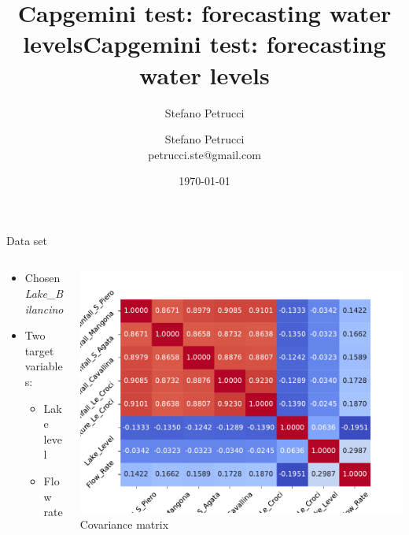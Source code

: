 \documentclass[aspectratio=169, glossy]{beamer}
\title{Capgemini test: forecasting water levels}
\author{Stefano Petrucci}
\institute{}
\date{\today}
\begin{document}

\begin{frame}[plain]
\title{\LARGE{\textcolor{MyBlue}{Capgemini test: forecasting water levels}}}
\author{
	Stefano Petrucci\\
	\footnotesize{petrucci.ste@gmail.com}
}
\date{}
\titlepage
\end{frame}




\begin{frame}{Data set}
  \begin{columns}
    \begin{column}{0.4\columnwidth}
      \begin{itemize}
        \item Chosen \textit{Lake\_Bilancino}
        \item Two target variables:
          \begin{itemize}
            \item Lake level
            \item Flow rate
          \end{itemize}
      \end{itemize}
    \end{column}
    \begin{column}{0.6\columnwidth}
      \begin{center}
        \includegraphics[width=0.45\columnwidth]{../plots/corr_vars.pdf}\\
        \vspace{0.5em}
        \tiny{Covariance matrix}
      \end{center}
    \end{column}
  \end{columns}
\end{frame}
\end{document}
